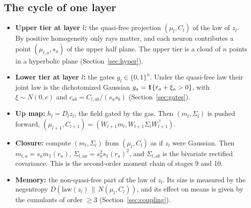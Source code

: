 \subsection{The cycle of one layer}
\begin{itemize}[leftmargin=*]
\item \textbf{Upper tier at layer $l$:} the quasi-free projection $(\mu_l,C_l)$ of the law of $z_l$. By positive homogeneity only rays
matter, and each neuron contributes a point $(\mu_{l,a},s_a)$ of the upper half plane. The upper tier is a cloud of $n$ points in a
hyperbolic plane (Section~\ref{sec:hyper}).
\item \textbf{Lower tier at layer $l$:} the gates $g_l\in\{0,1\}^n$. Under the quasi-free law their joint law is the dichotomized Gaussian
$g_a=\mathbf 1\{r_a+\xi_a>0\}$, with $\xi\sim N(0,c)$ and $c_{ab}=C_{l,ab}/(s_as_b)$ (Section~\ref{sec:gates}).
\item \textbf{Up map:} $h_l=D_lz_l$, the field gated by the gas. Then $(m_l,\Sigma_l)$ is pushed forward,
$(\mu_{l+1},C_{l+1})=(W_{l+1}m_l,W_{l+1}\Sigma_lW_{l+1}^{\top})$.
\item \textbf{Closure:} compute $(m_l,\Sigma_l)$ from $(\mu_l,C_l)$ as if $z_l$ were Gaussian. Then
$m_{l,a}=s_am_1(r_a)$, $\Sigma_{l,aa}=s_a^2s_1(r_a)^2$, and $\Sigma_{l,ab}$ is the bivariate rectified covariance. This is the
second-order moment chain of stages 9 and 10.
\item \textbf{Memory:} the non-quasi-free part of the law of $z_l$. Its size is measured by the negentropy
$D(\mathrm{law}(z_l)\,\|\,N(\mu_l,C_l))$, and its effect on means is given by the cumulants of order $\ge3$
(Section~\ref{sec:coupling}).
\end{itemize}

